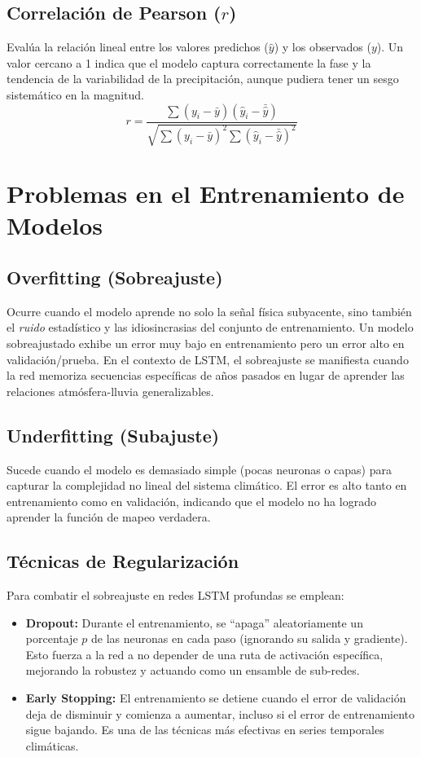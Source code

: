 \documentclass[titlepage,11pt]{report}
\begin{document}
\subsection{Correlación de Pearson (\(r\))}
Evalúa la relación lineal entre los valores predichos (\(\hat{y}\)) y los observados (\(y\)). Un valor cercano a 1 indica que el modelo captura correctamente la fase y la tendencia de la variabilidad de la precipitación, aunque pudiera tener un sesgo sistemático en la magnitud.
\begin{equation}
    r = \frac{\sum (y_i - \bar{y})(\hat{y}_i - \bar{\hat{y}})}{\sqrt{\sum (y_i - \bar{y})^2 \sum (\hat{y}_i - \bar{\hat{y}})^2}}
\end{equation}

\section{Problemas en el Entrenamiento de Modelos}

\subsection{Overfitting (Sobreajuste)}
Ocurre cuando el modelo aprende no solo la señal física subyacente, sino también el \textit{ruido} estadístico y las idiosincrasias del conjunto de entrenamiento. Un modelo sobreajustado exhibe un error muy bajo en entrenamiento pero un error alto en validación/prueba. En el contexto de LSTM, el sobreajuste se manifiesta cuando la red memoriza secuencias específicas de años pasados en lugar de aprender las relaciones atmósfera-lluvia generalizables.

\subsection{Underfitting (Subajuste)}
Sucede cuando el modelo es demasiado simple (pocas neuronas o capas) para capturar la complejidad no lineal del sistema climático. El error es alto tanto en entrenamiento como en validación, indicando que el modelo no ha logrado aprender la función de mapeo verdadera.

\subsection{Técnicas de Regularización}
Para combatir el sobreajuste en redes LSTM profundas se emplean:
\begin{itemize}
    \item \textbf{Dropout:} Durante el entrenamiento, se ``apaga'' aleatoriamente un porcentaje \(p\) de las neuronas en cada paso (ignorando su salida y gradiente). Esto fuerza a la red a no depender de una ruta de activación específica, mejorando la robustez y actuando como un ensamble de sub-redes.
    \item \textbf{Early Stopping:} El entrenamiento se detiene cuando el error de validación deja de disminuir y comienza a aumentar, incluso si el error de entrenamiento sigue bajando. Es una de las técnicas más efectivas en series temporales climáticas.
\end{itemize}
\end{document}
